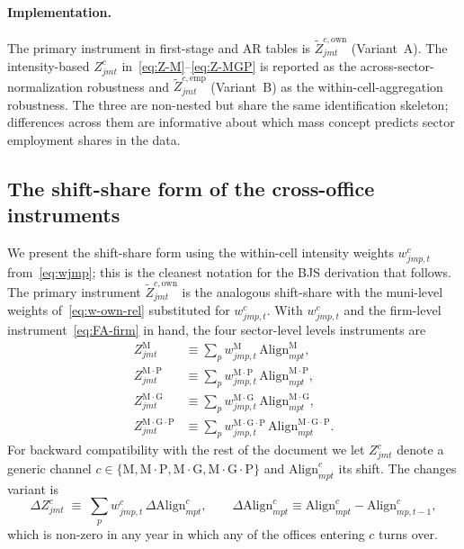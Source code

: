 \documentclass{article}
\newcommand{\Align}{\mathrm{Align}}
\theoremstyle{plain}
\theoremstyle{definition}
\theoremstyle{remark}
\begin{document}
\paragraph{Implementation.}
The primary instrument in first-stage and AR tables is
$\tilde Z^{c,\mathrm{own}}_{jmt}$ (Variant~A). The intensity-based
$Z^{c}_{jmt}$ in~\eqref{eq:Z-M}--\eqref{eq:Z-MGP} is reported as the
across-sector-normalization robustness and
$\tilde Z^{c,\mathrm{emp}}_{jmt}$ (Variant~B) as the
within-cell-aggregation robustness. The three are non-nested but
share the same identification skeleton; differences across them are
informative about which mass concept predicts sector employment
shares in the data.

\subsection{The shift-share form of the cross-office instruments}

We present the shift-share form using the within-cell intensity
weights $w^{c}_{jmp,t}$ from~\eqref{eq:wjmp}; this is the cleanest
notation for the BJS derivation that follows. The primary instrument
$\tilde Z^{c,\mathrm{own}}_{jmt}$ is the analogous shift-share with
the muni-level weights of~\eqref{eq:w-own-rel} substituted for
$w^{c}_{jmp,t}$. With $w^{c}_{jmp,t}$ and the firm-level
instrument~\eqref{eq:FA-firm} in hand, the four sector-level
levels instruments are
\begin{align}
  Z^{\mathrm{M}}_{jmt}
    &\equiv \sum_{p} w^{\mathrm{M}}_{jmp,t}\,\Align^{\mathrm{M}}_{mpt},
    \label{eq:Z-M}\\
  Z^{\mathrm{M{\cdot}P}}_{jmt}
    &\equiv \sum_{p} w^{\mathrm{M{\cdot}P}}_{jmp,t}\,\Align^{\mathrm{M{\cdot}P}}_{mpt},
    \label{eq:Z-MP}\\
  Z^{\mathrm{M{\cdot}G}}_{jmt}
    &\equiv \sum_{p} w^{\mathrm{M{\cdot}G}}_{jmp,t}\,\Align^{\mathrm{M{\cdot}G}}_{mpt},
    \label{eq:Z-MG}\\
  Z^{\mathrm{M{\cdot}G{\cdot}P}}_{jmt}
    &\equiv \sum_{p} w^{\mathrm{M{\cdot}G{\cdot}P}}_{jmp,t}\,\Align^{\mathrm{M{\cdot}G{\cdot}P}}_{mpt}.
    \label{eq:Z-MGP}
\end{align}
For backward compatibility with the rest of the document we let
$Z^{c}_{jmt}$ denote a generic channel
$c\in\{\mathrm{M},\mathrm{M{\cdot}P},\mathrm{M{\cdot}G},
\mathrm{M{\cdot}G{\cdot}P}\}$ and $\Align^{c}_{mpt}$ its shift. The
changes variant is
\begin{equation}\label{eq:dZ}
  \Delta Z^{c}_{jmt}
  \;\equiv\;
  \sum_{p} w^{c}_{jmp,t}\,\Delta\Align^{c}_{mpt},
  \qquad
  \Delta\Align^{c}_{mpt} \equiv \Align^{c}_{mpt}-\Align^{c}_{mp,t-1},
\end{equation}
which is non-zero in any year in which any of the offices entering $c$
turns over.
\end{document}
